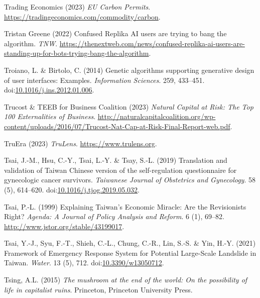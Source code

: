 \documentclass[
  letterpaper,
  DIV=11,
  numbers=noendperiod]{scrartcl}
\newlength{\cslhangindent}
\newenvironment{CSLReferences}[2] %
 {\begin{list}{}{%
  \setlength{\itemindent}{0pt}
  \setlength{\leftmargin}{0pt}
  \setlength{\parsep}{0pt}
  \ifodd #1
   \setlength{\leftmargin}{\cslhangindent}
   \setlength{\itemindent}{-1\cslhangindent}
  \fi
  \setlength{\itemsep}{#2\baselineskip}}}
 {\end{list}}
\begin{document}
\begin{CSLReferences}{0}{1}
Trading Economics (2023) \emph{{EU Carbon Permits}}.
\url{https://tradingeconomics.com/commodity/carbon}.

Tristan Greene (2022) Confused {Replika AI} users are trying to bang the
algorithm. \emph{TNW}.
\url{https://thenextweb.com/news/confused-replika-ai-users-are-standing-up-for-bots-trying-bang-the-algorithm}.

Troiano, L. \& Birtolo, C. (2014) Genetic algorithms supporting
generative design of user interfaces: {Examples}. \emph{Information
Sciences}. 259, 433--451.
doi:\href{https://doi.org/10.1016/j.ins.2012.01.006}{10.1016/j.ins.2012.01.006}.

Trucost \& TEEB for Business Coalition (2023) \emph{Natural {Capital} at
{Risk}: {The Top} 100 {Externalities} of {Business}}.
\url{http://naturalcapitalcoalition.org/wp-content/uploads/2016/07/Trucost-Nat-Cap-at-Risk-Final-Report-web.pdf}.

TruEra (2023) \emph{{TruLens}}. \url{https://www.trulens.org}.

Tsai, J.-M., Hsu, C.-Y., Tsai, L.-Y. \& Tsay, S.-L. (2019) Translation
and validation of {Taiwan Chinese} version of the self-regulation
questionnaire for gynecologic cancer survivors. \emph{Taiwanese Journal
of Obstetrics and Gynecology}. 58 (5), 614--620.
doi:\href{https://doi.org/10.1016/j.tjog.2019.05.032}{10.1016/j.tjog.2019.05.032}.

Tsai, P.-L. (1999) Explaining {Taiwan}'s {Economic Miracle}: {Are} the
{Revisionists Right}? \emph{Agenda: A Journal of Policy Analysis and
Reform}. 6 (1), 69--82. \url{http://www.jstor.org/stable/43199017}.

Tsai, Y.-J., Syu, F.-T., Shieh, C.-L., Chung, C.-R., Lin, S.-S. \& Yin,
H.-Y. (2021) Framework of {Emergency Response System} for {Potential
Large-Scale Landslide} in {Taiwan}. \emph{Water}. 13 (5), 712.
doi:\href{https://doi.org/10.3390/w13050712}{10.3390/w13050712}.

Tsing, A.L. (2015) \emph{The mushroom at the end of the world: On the
possibility of life in capitalist ruins}. Princeton, Princeton
University Press.


\end{CSLReferences}
\end{document}
